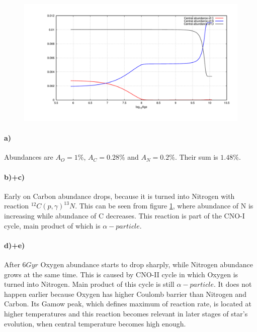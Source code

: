 \documentclass[12pt]{article}
\begin{document}
\subsection{}
\begin{figure}[!ht]
\begin{center}
\includegraphics[width=1.0\textwidth]{ex_1_5.png}
\end{center}
\vspace*{-10mm}
\caption{}
\label{fig:ex_1.5}
\end{figure}

\paragraph{a)}
Abundances are $A_O=1\%$, $A_C=0.28\%$ and $A_N=0.2\%$. Their sum is $1.48\%$.
\paragraph{b)+c)}
Early on Carbon abundance drops, because it is turned into Nitrogen with reaction $^{12}C(p,\gamma)^{13}N$. This can be seen from figure \ref{fig:ex_1.5}, where abundance of N is increasing while abundance of C decreases. This reaction is part of the CNO-I cycle, main product of which is $\alpha-particle$.
\paragraph{d)+e)}
After $6Gyr$ Oxygen abundance starts to drop sharply, while Nitrogen abundance grows at the same time. This is caused by CNO-II cycle in which Oxygen is turned into Nitrogen. Main product of this cycle is still $\alpha-particle$. It does not happen earlier because Oxygen has higher Coulomb barrier than Nitrogen and Carbon. Its Gamow peak, which defines maximum of reaction rate, is located at higher temperatures and this reaction becomes relevant in later stages of star's evolution, when central temperature becomes high enough.
\end{document}
